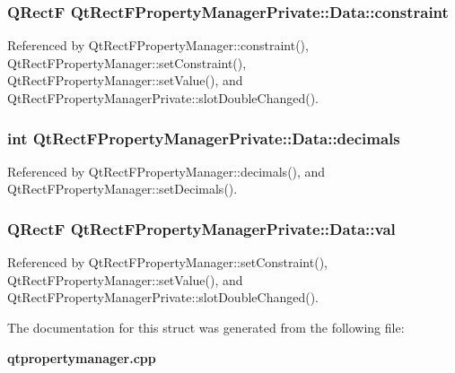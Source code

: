 \subsubsection[{constraint}]{\setlength{\rightskip}{0pt plus 5cm}Q\+RectF Qt\+Rect\+F\+Property\+Manager\+Private\+::\+Data\+::constraint}\label{structQtRectFPropertyManagerPrivate_1_1Data_ae541ea0bc52e7ab289566f913b2b22c4}


Referenced by Qt\+Rect\+F\+Property\+Manager\+::constraint(), Qt\+Rect\+F\+Property\+Manager\+::set\+Constraint(), Qt\+Rect\+F\+Property\+Manager\+::set\+Value(), and Qt\+Rect\+F\+Property\+Manager\+Private\+::slot\+Double\+Changed().

\subsubsection[{decimals}]{\setlength{\rightskip}{0pt plus 5cm}int Qt\+Rect\+F\+Property\+Manager\+Private\+::\+Data\+::decimals}\label{structQtRectFPropertyManagerPrivate_1_1Data_aabf56ec51615dc92ade86da58f091463}


Referenced by Qt\+Rect\+F\+Property\+Manager\+::decimals(), and Qt\+Rect\+F\+Property\+Manager\+::set\+Decimals().

\subsubsection[{val}]{\setlength{\rightskip}{0pt plus 5cm}Q\+RectF Qt\+Rect\+F\+Property\+Manager\+Private\+::\+Data\+::val}\label{structQtRectFPropertyManagerPrivate_1_1Data_a900ae7a917b3bc6e0f709df45d7f97ba}


Referenced by Qt\+Rect\+F\+Property\+Manager\+::set\+Constraint(), Qt\+Rect\+F\+Property\+Manager\+::set\+Value(), and Qt\+Rect\+F\+Property\+Manager\+Private\+::slot\+Double\+Changed().



The documentation for this struct was generated from the following file\+:\begin{DoxyCompactItemize}
\item 
{\bf qtpropertymanager.\+cpp}\end{DoxyCompactItemize}
